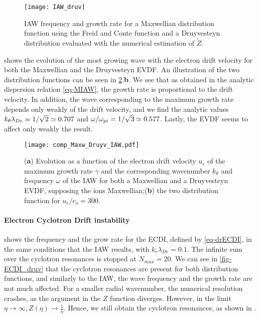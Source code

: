   \begin{figure}[!hbt]
    \centering
    \texttt{[image: IAW\_druv]}
    \caption{IAW frequency and growth rate for a Maxwellian distribution function using the Freid and Conte function and a Druyvesteyn distribution evaluated with the numerical estimation of $\tilde{Z}$. }
    \label{fig-IAW_druv}
  \end{figure}
   shows the evolution of the most growing wave with the electron drift velocity for both the Maxwellian and the Druyvesteyn \ac{EVDF}.
  An illustration of the two distribution functions can be seen in \cref{fig-valition-solver}.{\bf b}.
  We see that as obtained in the analytic dispersion relation \cref{eq-MIAW}, the growth rate is proportional to the drift velocity.
  In addition, the wave corresponding to the maximum growth rate depends only weakly of the drift velocity, and we find the analytic values $k_{\theta} \lambda_{De} =1/\sqrt{2} \simeq 0.707$ and $\omega / \omega_{pi} = 1/\sqrt{3} \simeq 0.577$. 
  Lastly, the \ac{EVDF} seems to affect only weakly the result.
  
  \begin{figure}[!hbt]
    \centering
    \texttt{[image: comp\_Maxw\_Druyv\_IAW.pdf]}
    \caption{({\bf a}) Evolution as a function of the electron drift velocity $u_e$ of the maximum growth rate $\gamma$ and the corresponding wavenumber $k_{\theta}$ and frequency $\omega$ of the \acs{IAW} for both a Maxwellian and a Druyvesteyn \acs{EVDF}, supposing the ions Maxwellian;({\bf b}) the two distribution function for $u_e/c_s = 300$.}
    \label{fig-valition-solver}
  \end{figure}
  
  \FloatBarrier
  
  \paragraph{Electron Cyclotron Drift instability\\}
    

  
   shows the frequency and the grow rate for the \ac{ECDI}, defined by \cref{eq-drECDI}, in the same conditions that the \ac{IAW} results, with $k_r \lambda_{De} = 0.1 $.
  The infinite sum over the cyclotron resonances is stopped at $N_{max} = 20$.
  We can see in \cref{fig-ECDI_druv} that the cyclotron resonances are present for both distribution functions, and similarly to the \ac{IAW}, the wave frequency and the growth rate are not much affected.
  For a smaller radial wavenumber, the numerical resolution crashes, as the argument in the $Z$ function diverges.
  However, in the limit $\eta \rightarrow \infty, Z(\eta) \rightarrow  \frac{1}{\eta}$.
  Hence, we still obtain the cyclotron resonances, as shown in \citet[Fig. 2]{janhunen2018}.
  
